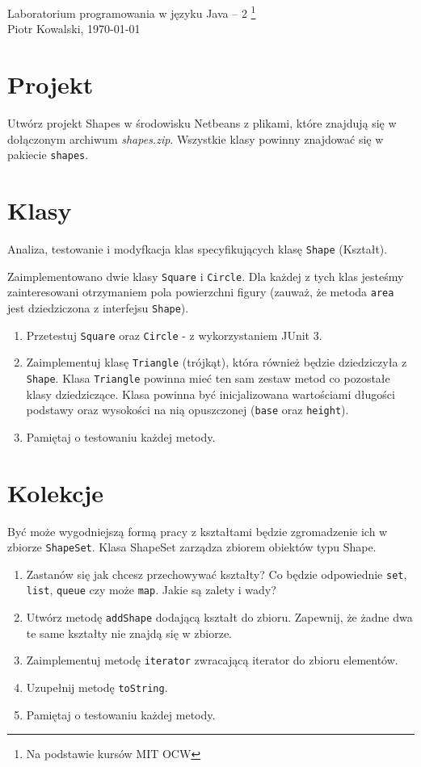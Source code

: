 \documentclass[12pt,letterpaper]{article}
\begin{document}
\linespread{1} %
\small \normalsize %
\begin{flushright}
Laboratorium programowania w języku Java -- 2 
\footnote{Na podstawie kursów MIT OCW} \\
Piotr Kowalski,
\today
\end{flushright}

\section{Projekt}
Utwórz projekt Shapes w środowisku Netbeans z plikami, które znajdują
się w dołączonym archiwum {\it shapes.zip}. Wszystkie klasy powinny
znajdować się w pakiecie \verb+shapes+.

\section{Klasy}
Analiza, testowanie i modyfkacja klas specyfikujących klasę \verb+Shape+ (Kształt).

Zaimplementowano dwie klasy \verb+Square+ i \verb+Circle+. Dla każdej z tych klas jesteśmy zainteresowani otrzymaniem pola powierzchni figury (zauważ, że metoda \verb+area+ jest dziedziczona z interfejsu \verb+Shape+).

\begin{enumerate}
\item Przetestuj \verb+Square+ oraz \verb+Circle+ - z wykorzystaniem JUnit 3.
\item Zaimplementuj klasę \verb+Triangle+ (trójkąt), która również będzie dziedziczyła z \verb+Shape+. Klasa \verb+Triangle+ powinna mieć ten sam zestaw metod co pozostałe klasy dziedziczące. Klasa powinna być inicjalizowana wartościami długości podstawy oraz wysokości na nią opuszczonej (\verb+base+ oraz \verb+height+).  
\item Pamiętaj o testowaniu każdej metody.
\end{enumerate}

\section{Kolekcje}
Być może wygodniejszą formą pracy z kształtami będzie zgromadzenie ich w zbiorze \verb+ShapeSet+. Klasa ShapeSet zarządza zbiorem obiektów typu Shape. 

\begin{enumerate}
\item Zastanów się jak chcesz przechowywać kształty? Co będzie odpowiednie \verb+set+, \verb+list+, \verb+queue+ czy może \verb+map+. Jakie są zalety i wady?
\item Utwórz metodę \verb+addShape+ dodającą kształt do zbioru. Zapewnij, że żadne dwa te same kształty nie znajdą się w zbiorze.
\item Zaimplementuj metodę \verb+iterator+ zwracającą iterator do zbioru elementów.
\item Uzupełnij metodę \verb+toString+.
\item Pamiętaj o testowaniu każdej metody.
\end{enumerate}
\end{document}
